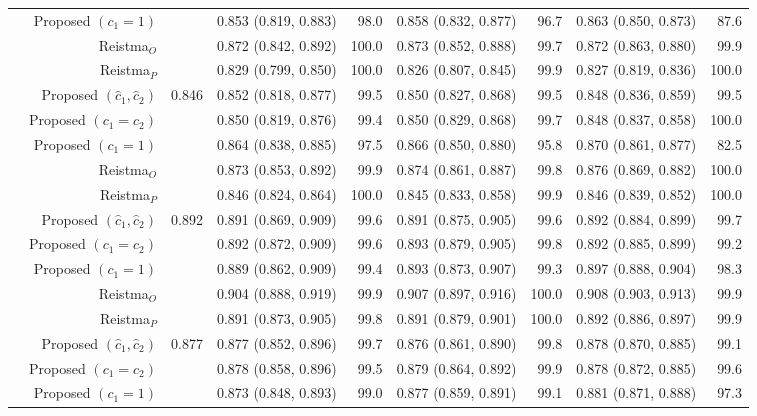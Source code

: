 \begin{table}
\begin{threeparttable}
\begin{tabular}[t]{rrrrrrrrr}
 & Proposed $(c_1 = 1)$ &  & 0.853 (0.819, 0.883) & 98.0 & 0.858 (0.832, 0.877) & 96.7 & 0.863 (0.850, 0.873) & 87.6\\
 & Reistma$_O$ &  & 0.872 (0.842, 0.892) & 100.0 & 0.873 (0.852, 0.888) & 99.7 & 0.872 (0.863, 0.880) & 99.9\\
 & Reistma$_P$ &  & 0.829 (0.799, 0.850) & 100.0 & 0.826 (0.807, 0.845) & 99.9 & 0.827 (0.819, 0.836) & 100.0\\
\addlinespace
4 & Proposed $(\hat{c}_1, \hat{c}_2)$ & 0.846 & 0.852 (0.818, 0.877) & 99.5 & 0.850 (0.827, 0.868) & 99.5 & 0.848 (0.836, 0.859) & 99.5\\
 & Proposed $(c_1 = c_2)$ &  & 0.850 (0.819, 0.876) & 99.4 & 0.850 (0.829, 0.868) & 99.7 & 0.848 (0.837, 0.858) & 100.0\\
 & Proposed $(c_1 = 1)$ &  & 0.864 (0.838, 0.885) & 97.5 & 0.866 (0.850, 0.880) & 95.8 & 0.870 (0.861, 0.877) & 82.5\\
 & Reistma$_O$ &  & 0.873 (0.853, 0.892) & 99.9 & 0.874 (0.861, 0.887) & 99.8 & 0.876 (0.869, 0.882) & 100.0\\
 & Reistma$_P$ &  & 0.846 (0.824, 0.864) & 100.0 & 0.845 (0.833, 0.858) & 99.9 & 0.846 (0.839, 0.852) & 100.0\\
\addlinespace
5 & Proposed $(\hat{c}_1, \hat{c}_2)$ & 0.892 & 0.891 (0.869, 0.909) & 99.6 & 0.891 (0.875, 0.905) & 99.6 & 0.892 (0.884, 0.899) & 99.7\\
 & Proposed $(c_1 = c_2)$ &  & 0.892 (0.872, 0.909) & 99.6 & 0.893 (0.879, 0.905) & 99.8 & 0.892 (0.885, 0.899) & 99.2\\
 & Proposed $(c_1 = 1)$ &  & 0.889 (0.862, 0.909) & 99.4 & 0.893 (0.873, 0.907) & 99.3 & 0.897 (0.888, 0.904) & 98.3\\
 & Reistma$_O$ &  & 0.904 (0.888, 0.919) & 99.9 & 0.907 (0.897, 0.916) & 100.0 & 0.908 (0.903, 0.913) & 99.9\\
 & Reistma$_P$ &  & 0.891 (0.873, 0.905) & 99.8 & 0.891 (0.879, 0.901) & 100.0 & 0.892 (0.886, 0.897) & 99.9\\
\addlinespace
6 & Proposed $(\hat{c}_1, \hat{c}_2)$ & 0.877 & 0.877 (0.852, 0.896) & 99.7 & 0.876 (0.861, 0.890) & 99.8 & 0.878 (0.870, 0.885) & 99.1\\
 & Proposed $(c_1 = c_2)$ &  & 0.878 (0.858, 0.896) & 99.5 & 0.879 (0.864, 0.892) & 99.9 & 0.878 (0.872, 0.885) & 99.6\\
 & Proposed $(c_1 = 1)$ &  & 0.873 (0.848, 0.893) & 99.0 & 0.877 (0.859, 0.891) & 99.1 & 0.881 (0.871, 0.888) & 97.3\\

\end{tabular}
\end{threeparttable}
\end{table}
